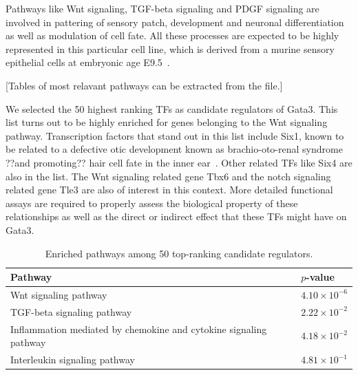 \documentclass{article}
\begin{document}
Pathways like Wnt signaling, TGF-beta signaling and PDGF signaling are
involved  in  pattering of  sensory  patch,  development and  neuronal
differentiation  as  well  as  modulation  of  cell  fate.  All  these
processes  are expected to  be highly  represented in  this particular
cell line, which is derived  from a murine sensory epithelial cells at
embryonic age E9.5~\cite{Milo2009}.

[Tables of most relavant pathways can be extracted from the file.]

We  selected the  50 highest  ranking TFs  as candidate  regulators of
Gata3.  This list turns out  to be highly enriched for genes belonging
to the Wnt signaling pathway.  Transcription factors that stand out in
this  list include  Six1,  known to  be  related to  a defective  otic
development  known  as  brachio-oto-renal syndrome  ??and  promoting??
   hair  cell   fate   in  the   inner
ear~\cite{Fritzsch2007,Bosman2009}.  Other  related TFs like  Six4 are
also in  the list. The Wnt  signaling related gene Tbx6  and the notch
signaling related gene Tle3 are also of interest in this context. More
detailed  functional  assays  are  required  to  properly  assess  the
biological property  of these relationships  as well as the  direct or
indirect effect that these TFs might have on Gata3.

\begin{table}[htb]
  \caption{Enriched pathways among 50 top-ranking candidate regulators. }
  \label{tab:pathways}
 \centering
  \begin{tabularx}{\columnwidth}{Xl}
    Pathway & $p$-value \\
    \hline
    Wnt signaling pathway &	$4.10\times 10^{-6}$ \\
    TGF-beta signaling pathway & $2.22\times 10^{-2}$ \\
    Inflammation mediated by chemokine and cytokine signaling pathway & $4.18\times 10^{-2}$ \\
    Interleukin signaling pathway & $4.81\times 10^{-1}$\\
  \end{tabularx}
 \end{table}
\end{document}

